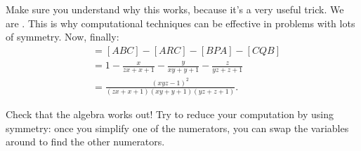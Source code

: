 \documentclass[11pt,paper=letter]{scrartcl}
\begin{document}
Make sure you understand why this works, because it's a very useful trick. We are . This is why computational techniques can be effective in problems with lots of symmetry. Now, finally:
\begin{align*}
  [PQR] &= [ABC] - [ARC] - [BPA] - [CQB] \\
  &= 1 - \frac{x}{zx+x+1} - \frac{y}{xy+y+1} - \frac{z}{yz+z+1} \\
  &= \frac{(xyz - 1)^2}{(zx+x+1)(xy+y+1)(yz+z+1)}.
\end{align*}

\begin{exboxed}
  Check that the algebra works out! Try to reduce your computation by using symmetry: once you simplify one of the numerators, you can swap the variables around to find the other numerators. \hint{\ref{h:rt06}}
\end{exboxed}

\vspace{-10pt}
\end{document}
